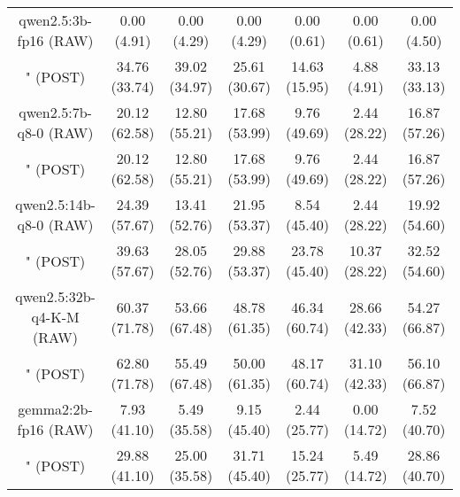 \begin{table}[]
{\begin{tabular}{ccccccc}
      \multicolumn{1}{c|}{qwen2.5:3b-fp16 (RAW)} & 0.00 (4.91) & 0.00 (4.29) & \multicolumn{1}{c|}{0.00 (4.29)} & 0.00 (0.61) & \multicolumn{1}{c|}{0.00 (0.61)} & 0.00 (4.50) \\

      \multicolumn{1}{c|}{" (POST)} & 34.76 (33.74) & 39.02 (34.97) & \multicolumn{1}{c|}{25.61 (30.67)} & 14.63 (15.95) & \multicolumn{1}{c|}{4.88 (4.91)} & 33.13 (33.13) \\
      \cline{1-7}

      \multicolumn{1}{c|}{qwen2.5:7b-q8-0 (RAW)} & 20.12 (62.58) & 12.80 (55.21) & \multicolumn{1}{c|}{17.68 (53.99)} & 9.76 (49.69) & \multicolumn{1}{c|}{2.44 (28.22)} & 16.87 (57.26) \\

      \multicolumn{1}{c|}{" (POST)} & 20.12 (62.58) & 12.80 (55.21) & \multicolumn{1}{c|}{17.68 (53.99)} & 9.76 (49.69) & \multicolumn{1}{c|}{2.44 (28.22)} & 16.87 (57.26) \\
      \cline{1-7}

      \multicolumn{1}{c|}{qwen2.5:14b-q8-0 (RAW)} & 24.39 (57.67) & 13.41 (52.76) & \multicolumn{1}{c|}{21.95 (53.37)} & 8.54 (45.40) & \multicolumn{1}{c|}{2.44 (28.22)} & 19.92 (54.60) \\

      \multicolumn{1}{c|}{" (POST)} & 39.63 (57.67) & 28.05 (52.76) & \multicolumn{1}{c|}{29.88 (53.37)} & 23.78 (45.40) & \multicolumn{1}{c|}{10.37 (28.22)} & 32.52 (54.60) \\
      \cline{1-7}

      \multicolumn{1}{c|}{qwen2.5:32b-q4-K-M (RAW)} & 60.37 (71.78) & 53.66 (67.48) & \multicolumn{1}{c|}{48.78 (61.35)} & 46.34 (60.74) & \multicolumn{1}{c|}{28.66 (42.33)} & 54.27 (66.87) \\

      \multicolumn{1}{c|}{" (POST)} & 62.80 (71.78) & 55.49 (67.48) & \multicolumn{1}{c|}{50.00 (61.35)} & 48.17 (60.74) & \multicolumn{1}{c|}{31.10 (42.33)} & 56.10 (66.87) \\
      \cline{1-7}

      \multicolumn{1}{c|}{gemma2:2b-fp16 (RAW)} & 7.93 (41.10) & 5.49 (35.58) & \multicolumn{1}{c|}{9.15 (45.40)} & 2.44 (25.77) & \multicolumn{1}{c|}{0.00 (14.72)} & 7.52 (40.70) \\

      \multicolumn{1}{c|}{" (POST)} & 29.88 (41.10) & 25.00 (35.58) & \multicolumn{1}{c|}{31.71 (45.40)} & 15.24 (25.77) & \multicolumn{1}{c|}{5.49 (14.72)} & 28.86 (40.70) \\
      \cline{1-7}


\end{tabular}}
\end{table}
